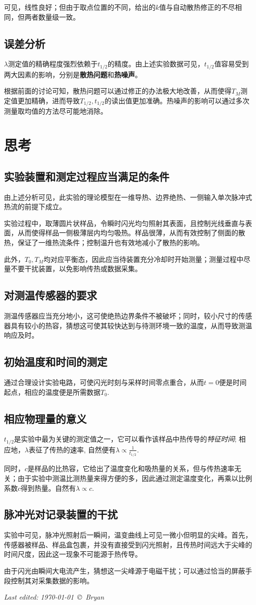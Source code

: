 \documentclass[a4paper,11pt]{article}
\begin{document}
	可见，线性良好；但由于取点位置的不同，给出的$k$值与自动散热修正的不尽相同，但两者数量级一致。
\subsection{误差分析}
	$\lambda$测定值的精确程度强烈依赖于$t_{1/2}$的精度。由上述实验数据可见，$t_{1/2}$值容易受到两大因素的影响，分别是\textbf{散热问题}和\textbf{热噪声}。
	
	根据前面的讨论可知，散热问题可以通过修正的办法极大地改善，从而使得$T_M$测定值更加精确，进而导致$T_{1/2}, t_{1/2}$的读出值更加准确。热噪声的影响可以通过多次测量取均值的方法尽可能地消除。
\section{思考}
\subsection{实验装置和测定过程应当满足的条件}
	由上述分析可见，此实验的理论模型在一维导热、边界绝热、一侧输入单次脉冲式热流的前提下成立。
	
	实验过程中，取薄圆片状样品，令瞬时闪光均匀照射其表面，且控制光线垂直与表面，从而使得样品一侧极薄层内均匀吸热。样品很薄，从而有效控制了侧面的散热，保证了一维热流条件；控制温升也有效地减小了散热的影响。
	
	此外，$T_0,T_M$均对应平衡态，因此应当待装置充分冷却时开始测量；测量过程中尽量不要干扰装置，以免影响传热或数据采集。
\subsection{对测温传感器的要求}
	测温传感器应当充分地小，这可使绝热边界条件不被破坏；同时，较小尺寸的传感器具有较小的热容，猜想这可使其较快达到与待测环境一致的温度，从而导致测温响应及时。
\subsection{初始温度和时间的测定}
	通过合理设计实验电路，可使闪光时刻与采样时间零点重合，从而$t = 0$便是时间起点，相应的温度便是所需数据$T_0$. 
\subsection{相应物理量的意义}
	$t_{1/2}$是实验中最为关键的测定值之一，它可以看作该样品中热传导的\textit{特征时间}; 相应地，$\lambda$表征了传热的速率, 自然便有$\lambda\propto\frac{1}{t_{1/2}}$. 
	
	同时，$c$是样品的比热容，它给出了温度变化和吸热量的关系，但与传热速率无关；由于实验中测温比测热量来得方便的多，因此通过测定温度变化，再乘以比例系数$c$得到热量。自然有$\lambda\propto c$. 
\subsection{脉冲光对记录装置的干扰}
	实验中可见，脉冲光照射后一瞬间，温变曲线上可见一微小但明显的尖峰。首先，传感器被样品、样品盒包裹，并没有直接受到闪光照射，且传热时间远大于尖峰的时间尺度，因此这一现象不可能源于热传导。
	
	由于闪光由瞬间大电流产生，猜想这一尖峰源于电磁干扰；可以通过恰当的屏蔽手段控制其对采集数据的影响。
	
	\vfill\noindent\itshape\footnotesize
	\hfill Last edited: \today\ \copyright\ Bryan
\end{document}
